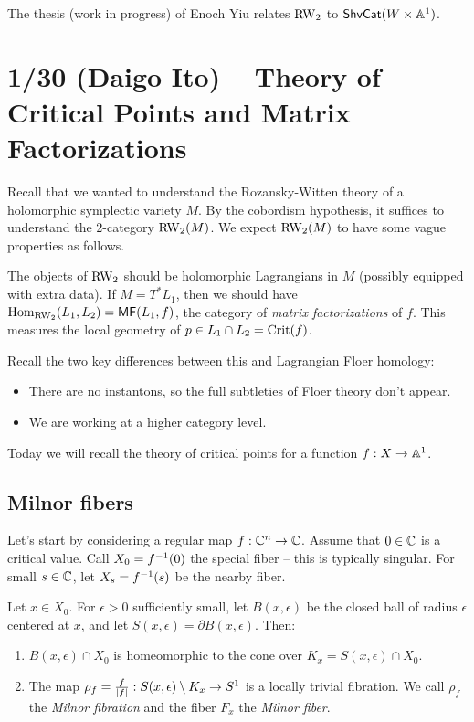 \documentclass{article}
\begin{document}
The thesis (work in progress) of Enoch Yiu relates $\RW_2$ to $\ShvCat(W \times \AA^1)$.

\section{1/30 (Daigo Ito) -- Theory of Critical Points and Matrix Factorizations}

Recall that we wanted to understand the Rozansky-Witten theory of a holomorphic symplectic variety $M$.
By the cobordism hypothesis, it suffices to understand the 2-category $\RW_2(M)$.
We expect $\RW_2(M)$ to have some vague properties as follows.

The objects of $\RW_2$ should be holomorphic Lagrangians in $M$ (possibly equipped with extra data).
If $M = T^* L_1$, then we should have $\Hom_{\RW_2}(L_1, L_2) = \MF(L_1, f)$, the category of \emph{matrix factorizations} of $f$.
This measures the local geometry of $p \in L_1 \cap L_2 = \Crit(f)$.

Recall the two key differences between this and Lagrangian Floer homology:
\begin{itemize}
	\item There are no instantons, so the full subtleties of Floer theory don't appear.
	\item We are working at a higher category level.
\end{itemize}

Today we will recall the theory of critical points for a function $f: X \to \AA^1$.

\subsection{Milnor fibers}

Let's start by considering a regular map $f: \CC^n \to \CC$.
Assume that $0 \in \CC$ is a critical value.
Call $X_0 = f\inv(0)$ the special fiber -- this is typically singular.
For small $s \in \CC$, let $X_s = f\inv(s)$ be the nearby fiber.

\begin{thm}[Milnor]
	Let $x \in X_0$.
	For $\epsilon > 0$ sufficiently small, let $B(x, \epsilon)$ be the closed ball of radius $\epsilon$ centered at $x$, and let $S(x, \epsilon) = \partial B(x, \epsilon)$.
	Then:
	\begin{enumerate}
		\item $B(x, \epsilon) \cap X_0$ is homeomorphic to the cone over $K_x = S(x, \epsilon) \cap X_0$.
		\item The map $\rho_f = \frac{f}{\abs{f}} : S(x, \epsilon)  \setminus K_x \to S^1$ is a locally trivial fibration.
			We call $\rho_f$ the \emph{Milnor fibration} and the fiber $F_x$ the \emph{Milnor fiber}.
	\end{enumerate}
\end{thm}
\end{document}
